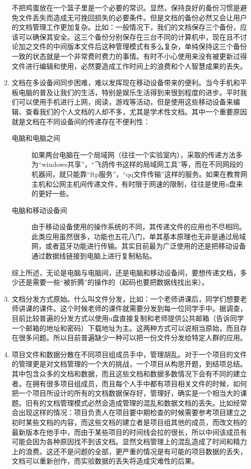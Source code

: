 \begin{enumerate}
不把鸡蛋放在一个篮子里是一个必要的常识。显然，保持良好的备份习惯是避免文件丢失而造成无可挽回损失的必要条件。但是文档的备份必然又会让用户的文档管理工作更加复杂。比如：一般情况下，我们的文档保存三个备份，应该可以确保其安全。这三个备份分别保存在三台不同的计算机中，现在且不讨论加之文件的中间版本文件后这种管理模式有多么复杂，单纯保持这三个备份一致的状态就是一个非常费时费力的事情。有时不小心使用来没有被更新过得文件进行编辑和使用，必然要造成工作时间上的浪费和个人智慧成果的丢失。
\item 文档在多设备间同步困难，难以发挥现在移动设备带来的便利。当今手机和平板电脑的普及让我们的生活，特别是娱乐生活得到来很到程度的进步。平时我们可以使用手机进行上网，阅读，游戏等活动，但是使用这些移动设备来编辑、查看我们的个人文档的人却不多，尤其是学术性文档。其中一个重要原因就是文档在不同设备间的传递存在不便利性：
  \begin{description}
  \item[电脑和电脑之间] 如果两台电脑在一个局域网（往往一个实验室内），采取的传递方法多为“windows共享”，“飞鸽传书这样的局域网工具”等，而在不同网段的机器间，就只能靠“ftp服务”，“qq文件传输”这样的服务。如果在教育网主机和公网主机间传递文件，有时限于网速的限制，往往是使用u盘来的更好一些。
  \item[电脑和移动设备间] 由于移动设备使用的操作系统的不同，其传递文件的应用也不尽相同。此类应用虽然很多，功能也五花八门，单其基本原理也无非是通过局域网，或者蓝牙功能进行传输。其实目前最为广泛使用的还是把移动设备通过数据线链接到电脑上进行复制粘贴。
  \end{description}
综上所述，无论是电脑与电脑间，还是电脑和移动设备间，要想传递文档，多少还是需要一些“被折腾”的操作的（起码也要把数据线找出来）。
\item 文档分发方式原始。什么叫文件分发，比如：一个老师讲课后，同学们想要老师讲课的课件。这个时候老师的课件就需要分发到每一位同学手中。据调查，目前比较普遍的分发方式以使用u盘直接复制和老师提供公共邮箱（告诉同学一个邮箱的地址和密码）下载地址为主。这两种方式可以说相当原始，而且存在很多问题。所以目前普遍缺少一种可以把一份文件分发给特定人群的应用。
\item 项目文件和数据分散在不同项目组成员手中，管理胡乱。对于一个项目的文件的管理更是对文档管理的一个大的挑战，一个项目从构思开题，到结项总结。其中包含众多的文档和数据，而且这些文档和数据多数情况下会有不同的建立者。在拥有很多项目组成员，而且每个人手中都有项目相关文件的时候，如何把一个项目所设计的所有的文档数据保存好，管理好，确实是一个相当大的课题。旧有的文档管理模式必然会造成管理的混乱和数据文档的丢失。比如经常会出现这样的情况：项目负责人在项目要中期检查的时候需要参考项目建立之初时某些文档的内容，而这些文档的建立者是项目组其他的成员，而改文档的最新版本在他手中，而由于某些项目的时间线会拉的很长，所以中间该成员有可能会因为各种原因找不到该文档。显然文档管理上的混乱造成了时间和精力上的浪费。这还不是问题的全部，更严重的情况是有可能的项目数据的丢失，文档可以重新创作，而实验数据的丢失将造成灾难性的后果。

\end{enumerate}
